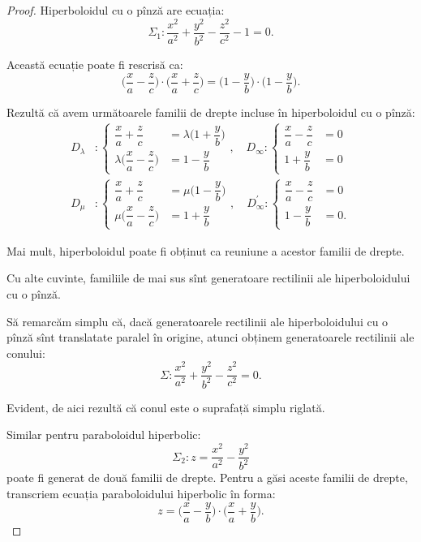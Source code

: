 \begin{proof}
	Hiperboloidul cu o pînză are ecuația: 
 \[
	\Sigma_1 : \dfrac{x^2}{a^2} + \dfrac{y^2}{b^2} - \dfrac{z^2}{c^2} - 1 = 0.
\]

Această ecuație poate fi rescrisă ca: 
 \[
\Big(\dfrac{x}{a} - \dfrac{z}{c}\Big) \cdot \Big(\dfrac{x}{a} + 
\dfrac{z}{c}\Big) =\Big( 1 - \dfrac{y}{b} \Big) \cdot 
\Big( 1 - \dfrac{y}{b} \Big).
\]

Rezultă că avem următoarele familii de drepte incluse în hiperboloidul cu 
o pînză:
\begin{align*}
D_\lambda &: \begin{cases}
        \dfrac{x}{a} + \dfrac{z}{c} &= \lambda \Big( 1 + \dfrac{y}{b} \Big) \\
        \lambda \Big( \dfrac{x}{a} - \dfrac{z}{c} \Big) &= 1- \dfrac{y}{b}
    \end{cases}, \quad
D_\infty: \begin{cases}
			\dfrac{x}{a} - \dfrac{z}{c} &= 0 \\
			1 + \dfrac{y}{b} &= 0
		  \end{cases} \\
D_\mu &: \begin{cases}	
			\dfrac{x}{a} + \dfrac{z}{c} &= \mu \Big( 1 - \dfrac{y}{b} \Big) \\
			\mu \Big( \dfrac{x}{a} - \dfrac{z}{c} \Big) &= 1 + \dfrac{y}{b}
		\end{cases}, \quad
D^{\prime}_\infty : \begin{cases}
						\dfrac{x}{a} - \dfrac{z}{c} &= 0 \\
						1 - \dfrac{y}{b} &= 0.
\end{cases} 
\end{align*}

Mai mult, hiperboloidul poate fi obținut ca reuniune a acestor familii 
de drepte.

Cu alte cuvinte, familiile de mai sus sînt generatoare rectilinii ale
hiperboloidului cu o pînză.

Să remarcăm simplu că, dacă generatoarele rectilinii ale hiperboloidului cu
o pînză sînt translatate paralel în origine, atunci obținem generatoarele
rectilinii ale conului: 
 \[
	\Sigma: \dfrac{x^2}{a^2} + \dfrac{y^2}{b^2} - \dfrac{z^2}{c^2} = 0.
\]

Evident, de aici rezultă că conul este o suprafață simplu riglată.

Similar pentru paraboloidul hiperbolic: 
 \[
	\Sigma_2 : z = \dfrac{x^2}{a^2} - \dfrac{y^2}{b^2}
\]
poate fi generat de două familii de drepte. Pentru a găsi aceste familii
de drepte, transcriem ecuația paraboloidului hiperbolic în forma: 
 \[
	z = \Big( \dfrac{x}{a} - \dfrac{y}{b} \Big) \cdot 
		\Big( \dfrac{x}{a} + \dfrac{y}{b} \Big).
\]


\end{proof}
